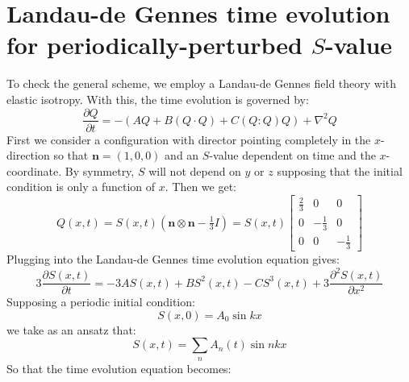 \documentclass[reqno]{article}
\begin{document}
\section{Landau-de Gennes time evolution for periodically-perturbed $S$-value}
To check the general scheme, we employ a Landau-de Gennes field theory with elastic isotropy.
With this, the time evolution is governed by:
\begin{equation}
    \frac{\partial Q}{\partial t}
    =
    - \left( A Q + B (Q \cdot Q) + C (Q : Q) Q \right)
    + \nabla^2 Q
\end{equation}
First we consider a configuration with director pointing completely in the $x$-direction so that $\mathbf{n} = (1, 0, 0)$ and an $S$-value dependent on time and the $x$-coordinate.
By symmetry, $S$ will not depend on $y$ or $z$ supposing that the initial condition is only a function of $x$.
Then we get:
\begin{equation}
    Q(x, t)
    =
    S(x, t) \left( \mathbf{n} \otimes \mathbf{n} - \tfrac13 I \right)
    =
    S(x, t)
    \begin{bmatrix}
        \tfrac23 &0 &0 \\
        0 &-\tfrac13 &0 \\
        0 &0 &-\tfrac13
    \end{bmatrix}
\end{equation}
Plugging into the Landau-de Gennes time evolution equation gives:
\begin{equation}
    3 \frac{\partial S(x, t)}{\partial t} 
    =
    - 3 A S(x, t)
    + B S^2(x, t)
    - C S^3(x, t)
    + 3 \frac{\partial^2 S(x, t)}{\partial x^2}
\end{equation}
Supposing a periodic initial condition:
\begin{equation}
    S(x, 0)
    =
    A_0 \sin k x
\end{equation}
we take as an ansatz that:
\begin{equation}
    S(x, t)
    = \sum_n A_n (t) \sin nkx
\end{equation}
So that the time evolution equation becomes:
\end{document}
